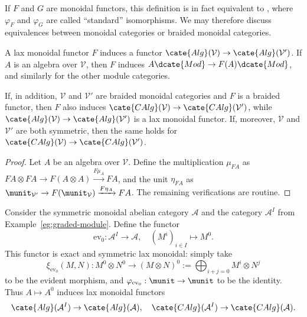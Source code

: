 If $F$ and $G$ are monoidal functors, this definition is in fact equivalent
to \cite[Definition 3.1.10]{Li1}, where $\varphi_F$ and $\varphi_G$ are
called “standard” isomorphisms. We may therefore discuss equivalences between
monoidal categories or braided monoidal categories.

\begin{proposition}\label{prop:lax-monoidal-Alg}
	A lax monoidal functor $F$ induces a functor
	$\cate{Alg}(\mathcal{V})\to\cate{Alg}(\mathcal{V}')$. If $A$ is an
	algebra over $\mathcal{V}$, then $F$ induces
	$A\dcate{Mod}\to F(A)\dcate{Mod}$, and similarly for the other module
	categories.

	If, in addition, $\mathcal{V}$ and $\mathcal{V}'$ are braided monoidal
	categories and $F$ is a braided functor, then $F$ also induces
	$\cate{CAlg}(\mathcal{V})\to\cate{CAlg}(\mathcal{V}')$, while
	$\cate{Alg}(\mathcal{V})\to\cate{Alg}(\mathcal{V}')$ is a lax monoidal
	functor. If, moreover, $\mathcal{V}$ and $\mathcal{V}'$ are both
	symmetric, then the same holds for
	$\cate{CAlg}(\mathcal{V})\to\cate{CAlg}(\mathcal{V}')$.
\end{proposition}
\begin{proof}
	Let $A$ be an algebra over $\mathcal{V}$. Define the multiplication
	$\mu_{FA}$ as
	$FA\otimes FA\to F(A\otimes A)\xrightarrow{F\mu_A}FA$, and the unit
	$\eta_{FA}$ as
	$\munit_{\mathcal{V}'}\to F(\munit_{\mathcal{V}})\xrightarrow{F\eta_A}FA$.
	The remaining verifications are routine.
\end{proof}

\begin{example}\label{eg:ev0-monoidal}
	Consider the symmetric monoidal abelian category $\mathcal{A}$ and the
	category $\mathcal{A}^I$ from Example~\ref{eg:graded-module}. Define the
	functor
	\[ \mathrm{ev}_0: \mathcal{A}^I \to \mathcal{A}, \quad \left(M^i\right)_{i \in I} \mapsto M^0. \]
	This functor is exact and symmetric lax monoidal: simply take
	\[ \xi_{\mathrm{ev}_0}(M, N): M^0 \otimes N^0 \to (M \otimes N)^0 := \bigoplus_{i+j=0} M^i \otimes N^j \]
	to be the evident morphism, and
	$\varphi_{\mathrm{ev}_0}:\munit\to\munit$ to be the identity. Thus
	$A\mapsto A^0$ induces lax monoidal functors
	\[ \cate{Alg}(\mathcal{A}^I) \to \cate{Alg}(\mathcal{A}), \quad \cate{CAlg}(\mathcal{A}^I) \to \cate{CAlg}(\mathcal{A}). \]
\end{example}

